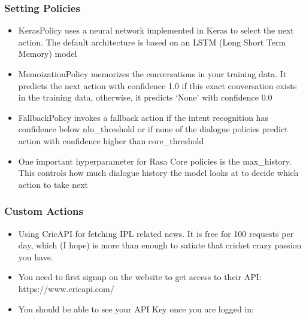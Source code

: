  \begin{frame}[fragile]\frametitle{Setting Policies}

 
\begin{itemize}
\item KerasPolicy uses a neural network implemented in Keras to select the next action. The default architecture is based on an LSTM (Long Short Term Memory) model
\item MemoizationPolicy memorizes the conversations in your training data. It predicts the next action with confidence 1.0 if this exact conversation exists in the training data, otherwise, it predicts `None' with confidence 0.0
\item FallbackPolicy invokes a fallback action if the intent recognition has confidence below nlu\_threshold or if none of the dialogue policies predict action with confidence higher than core\_threshold
\item One important hyperparameter for Rasa Core policies is the max\_history. This controls how much dialogue history the model looks at to decide which action to take next
\end{itemize}

\end{frame}

 \begin{frame}[fragile]\frametitle{Custom Actions}

 
\begin{itemize}
\item Using CricAPI for fetching IPL related news. It is free for 100 requests per day, which (I hope) is more than enough to satiate that cricket crazy passion you have.
\item You need to first signup on the website to get access to their API: https://www.cricapi.com/
\item You should be able to see your API Key once you are logged in:
\end{itemize}

\end{frame}

